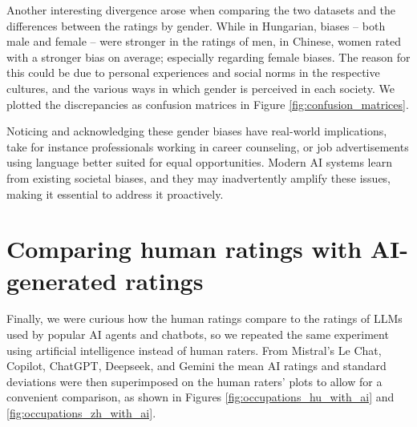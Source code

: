 \documentclass[11pt]{article}
\begin{document}
Another interesting divergence arose when comparing the two datasets and the differences between the ratings by gender. While in Hungarian, biases -- both male and female -- were stronger in the ratings of men, in Chinese, women rated with a stronger bias on average; especially regarding female biases. The reason for this could be due to personal experiences and social norms in the respective cultures, and the various ways in which gender is perceived in each society. We plotted the discrepancies as confusion matrices in Figure \ref{fig:confusion_matrices}.



Noticing and acknowledging these gender biases have real-world implications, take for instance professionals working in career counseling, or job advertisements using language better suited for equal opportunities. Modern AI systems learn from existing societal biases, and they may inadvertently amplify these issues, making it essential to address it proactively.


\section{Comparing human ratings with AI-generated ratings}
\label{sec:ai_comparison}

Finally, we were curious how the human ratings compare to the ratings of LLMs used by popular AI agents and chatbots, so we repeated the same experiment using artificial intelligence instead of human raters. From Mistral's Le Chat, Copilot, ChatGPT, Deepseek, and Gemini the mean AI ratings and standard deviations were then superimposed on the human raters' plots to allow for a convenient comparison, as shown in Figures \ref{fig:occupations_hu_with_ai} and \ref{fig:occupations_zh_with_ai}.
\end{document}
